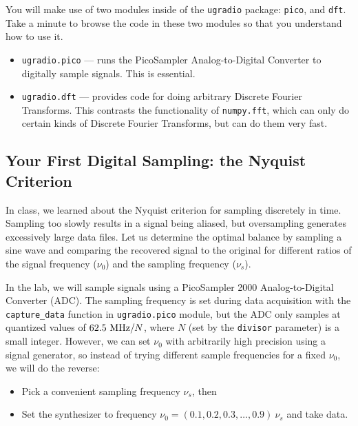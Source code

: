 \documentclass[12pt,preprint]{aastex}
\begin{document}
You will make use of two modules inside of the {\tt ugradio} package: {\tt pico}, and {\tt dft}.
Take a minute to browse the code in these two modules so that you understand how to use it.

\begin{itemize}

\item {\tt ugradio.pico} --- runs the PicoSampler Analog-to-Digital Converter to digitally sample signals. This is essential.

\item {\tt ugradio.dft} --- provides code for doing arbitrary Discrete Fourier Transforms.  This
contrasts the functionality of {\tt numpy.fft}, which can only do certain kinds of
Discrete Fourier Transforms, but can do them very fast.



\end{itemize}


\subsection{Your First Digital Sampling: the Nyquist Criterion}

\noindent
In class, we learned about the 
Nyquist criterion for sampling discretely in time. 
Sampling too slowly results in a signal being aliased, but oversampling
generates excessively large data files.
Let us determine the optimal balance by sampling a sine wave
and comparing the recovered signal
to the original for different ratios of the signal frequency ($\nu_0$) and the
sampling frequency ($\nu_s$).

In the lab, we will sample signals using a PicoSampler 2000 Analog-to-Digital Converter (ADC).
The sampling frequency is set during data acquisition with the {\tt capture\_data} function
in {\tt ugradio.pico} module, but the ADC only samples at
quantized values of $62.5~{\rm MHz} / N$, where $N$ (set by the {\tt divisor} parameter)
is a small integer. However, we can set
$\nu_0$ with arbitrarily high precision using a signal generator, so instead of trying
different sample frequencies for a fixed $\nu_0$, we will do the reverse:
\begin{itemize} 
	\item Pick a convenient sampling frequency $\nu_s$, then
	\item Set the synthesizer to frequency $\nu_0 = (0.1, 0.2,
	  0.3, \dots, 0.9)~\nu_s$ and take data. 
\end{itemize}
\end{document}
